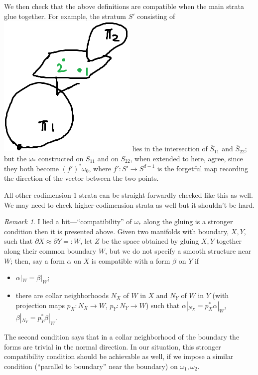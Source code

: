\documentclass[11pt]{article}
\theoremstyle{definition}
\theoremstyle{remark}
\newtheorem{rmk}[thm]{Remark}
\def\ov#1{\overline{#1}}
\begin{document}
We then check that the above definitions are compatible when the main strata glue together. 
For example, the stratum $S'$ consisting of 
\includegraphics[scale=0.4]{S11capS22} lies in the intersection of $\ov{S}_{11}$ and $\ov{S}_{22}$;
but the $\omega_*$ constructed on $S_{11}$ and on $S_{22}$, when extended to here, agree, 
since they both become $(f')^*\omega_0$, where $f':S'\to S^{d-1}$ is the forgetful map recording the direction of the vector between the two points.

All other codimension-1 strata can be straight-forwardly checked like this as well. 
We may need to check higher-codimension strata as well but it shouldn't be hard.

\begin{rmk}
I lied a bit---``compatibility'' of $\omega_*$ along the gluing is a stronger condition then it is presented above. 
Given two manifolds with boundary, $X,Y$, such that $\partial X\approx \partial Y=:W$, let $Z$ be the space obtained by gluing $X,Y$ together along their common boundary $W$, but we do not specify a smooth structure near $W$;
then, say a form $\alpha$ on $X$ is compatible with a form $\beta$ on $Y$ if 
\begin{itemize}
\item $\alpha|_W=\beta|_{W}$;
\item there are collar neighborhoods $N_X$ of $W$ in $X$ and $N_Y$ of $W$ in $Y$ (with projection maps $p_X:N_X\to W$, $p_Y:N_Y\to W$) such that 
$\alpha|_{N_X}=p_X^*\alpha|_W$, $\beta|_{N_Y}=p_Y^*\beta|_W$. 
\end{itemize} 
The second condition says that in a collar neighborhood of the boundary the forms are trivial in the normal direction. 
In our situation, this stronger compatibility condition should be achievable as well, if we impose a similar condition (``parallel to boundary'' near the boundary) on $\omega_1,\omega_2$. 
\end{rmk} 
\end{document}
